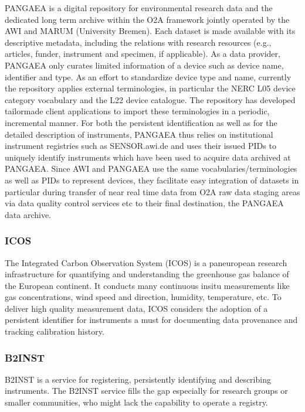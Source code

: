 \documentclass[a4paper,10pt,english]{sphinxmanual}
\begin{document}
\sphinxAtStartPar
PANGAEA is a digital repository for environmental research data and
the dedicated long term archive within the O2A framework jointly
operated by the AWI and MARUM (University Bremen).  Each dataset is
made available with its descriptive metadata, including the relations
with research resources (e.g., articles, funder, instrument and
specimen, if applicable).  As a data provider, PANGAEA only curates
limited information of a device such as device name, identifier and
type.  As an effort to standardize device type and name, currently the
repository applies external terminologies, in particular the NERC L05
device category vocabulary and the L22 device catalogue.  The
repository has developed tailor\sphinxhyphen{}made client applications to import
these terminologies in a periodic, incremental manner.  For both the
persistent identification as well as for the detailed description of
instruments, PANGAEA thus relies on institutional instrument
registries such as SENSOR.awi.de and uses their issued PIDs to
uniquely identify instruments which have been used to acquire data
archived at PANGAEA.  Since AWI and PANGAEA use the same
vocabularies/terminologies as well as PIDs to represent devices, they
facilitate easy integration of datasets in particular during transfer
of near real time data from O2A raw data staging areas via data
quality control services etc to their final destination, the PANGAEA
data archive.\sphinxfootnotemark[5]


\subsubsection{ICOS}
\label{\detokenize{white-paper/adoption:icos}}
\sphinxAtStartPar
The Integrated Carbon Observation System (ICOS) is a pan\sphinxhyphen{}european
research infrastructure for quantifying and understanding the
greenhouse gas balance of the European continent.  It conducts many
continuous in\sphinxhyphen{}situ measurements like gas concentrations, wind speed
and direction, humidity, temperature, etc.  To deliver high quality
measurement data, ICOS considers the adoption of a persistent
identifier for instruments a must for documenting data provenance and
tracking calibration history.


\subsubsection{B2INST}
\label{\detokenize{white-paper/adoption:b2inst}}
\sphinxAtStartPar
B2INST is a service for registering, persistently identifying and
describing instruments.  The B2INST service fills the gap especially
for research groups or smaller communities, who might lack the
capability to operate a registry.
\end{document}
